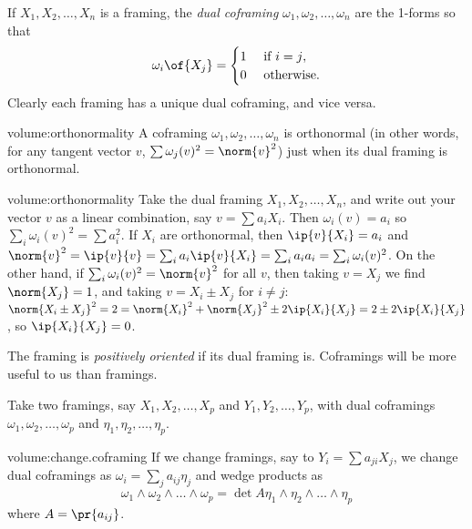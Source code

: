 If \(X_1, X_2, \dots, X_n\) is a framing, the \emph{dual coframing}%
\(\omega_1, \omega_2, \dots, \omega_n\) are the 1-forms so that 
\[
\omega_i\of{X_j}=
\begin{cases}
1 & \text{ if \(i=j\)}, \\
0 & \text{ otherwise.}
\end{cases}
\]
Clearly each framing has a unique dual coframing, and vice versa.

\begin{problem}{volume:orthonormality}
A coframing \(\omega_1, \omega_2, \dots, \omega_n\) is orthonormal (in other words, for any tangent vector \(v\), \(\sum \omega_j(v)^2=\norm{v}^2\)) just when its dual framing is orthonormal. 
\end{problem}
\begin{answer}{volume:orthonormality}
Take the dual framing \(X_1, X_2, \dots, X_n\), and write out your vector \(v\) as a linear combination, say \(v=\sum a_i X_i\).
Then \(\omega_i(v)=a_i\) so \(\sum_i \omega_i(v)^2=\sum a_i^2\).
If \(X_i\) are orthonormal, then \(\ip{v}{X_i}=a_i\) and \(\norm{v}^2=\ip{v}{v}=\sum_i a_i \ip{v}{X_i} = \sum_i a_i a_i = \sum_i \omega_i(v)^2\).
On the other hand, if \(\sum_i \omega_i(v)^2=\norm{v}^2\) for all \(v\), then taking \(v=X_j\) we find \(\norm{X_j}=1\), and taking \(v=X_i \pm X_j\) for \(i \ne j\): \(\norm{X_i \pm X_j}^2=2=\norm{X_i}^2+\norm{X_j}^2\pm 2\ip{X_i}{X_j}=2 \pm 2 \ip{X_i}{X_j}\), so \(\ip{X_i}{X_j}=0\).
\end{answer}

The framing is \emph{positively oriented}
if its dual framing is.
Coframings will be more useful to us than framings.

Take two framings, say \(X_1, X_2, \dots, X_p\) and \(Y_1, Y_2, \dots, Y_p\), with dual coframings \(\omega_1, \omega_2, \dots, \omega_p\) and \(\eta_1, \eta_2, \dots, \eta_p\).
\begin{problem}{volume:change.coframing}
If we change framings, say to \(Y_i = \sum a_{ji} X_j\), we change dual coframings as \(\omega_i = \sum_j a_{ij} \eta_j\) and wedge products as
\[
\omega_1 \wedge \omega_2 \wedge \dots \wedge \omega_p 
=
\det A \eta_1 \wedge \eta_2 \wedge \dots \wedge \eta_p
\]
where \(A=\pr{a_{ij}}\).
\end{problem}





